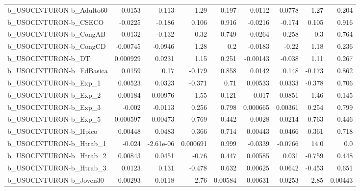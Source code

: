 \begin{tabular}{lrrrrrrrr}
b\_USOCINTURON-b\_Adulto60   &     -0.0153 &       -0.113 &      1.29 &    0.197 &    -0.0112 &     -0.0778 &         1.27 &         0.204 \\
b\_USOCINTURON-b\_CSECO      &     -0.0225 &       -0.186 &     0.106 &    0.916 &    -0.0216 &      -0.174 &        0.105 &         0.916 \\
b\_USOCINTURON-b\_CongAB     &     -0.0132 &       -0.132 &      0.32 &    0.749 &    -0.0264 &      -0.258 &          0.3 &         0.764 \\
b\_USOCINTURON-b\_CongCD     &    -0.00745 &      -0.0946 &      1.28 &      0.2 &    -0.0183 &       -0.22 &         1.18 &         0.236 \\
b\_USOCINTURON-b\_DT         &    0.000929 &       0.0231 &      1.15 &    0.251 &   -0.00143 &      -0.038 &         1.11 &         0.267 \\
b\_USOCINTURON-b\_EdBasica   &      0.0159 &         0.17 &    -0.179 &    0.858 &     0.0142 &       0.148 &       -0.173 &         0.862 \\
b\_USOCINTURON-b\_Exp\_1      &     0.00523 &       0.0323 &    -0.371 &     0.71 &    0.00533 &      0.0333 &       -0.378 &         0.706 \\
b\_USOCINTURON-b\_Exp\_2      &    -0.00184 &     -0.00976 &     -1.55 &    0.121 &     -0.017 &     -0.0851 &        -1.46 &         0.145 \\
b\_USOCINTURON-b\_Exp\_3      &      -0.002 &      -0.0113 &     0.256 &    0.798 &   0.000665 &     0.00361 &        0.254 &         0.799 \\
b\_USOCINTURON-b\_Exp\_5      &    0.000597 &      0.00473 &     0.769 &    0.442 &     0.0028 &      0.0214 &        0.763 &         0.446 \\
b\_USOCINTURON-b\_Hpico      &     0.00448 &       0.0483 &     0.366 &    0.714 &    0.00443 &      0.0466 &        0.361 &         0.718 \\
b\_USOCINTURON-b\_Htrab\_1    &      -0.024 &    -2.61e-06 &  0.000691 &    0.999 &    -0.0339 &     -0.0766 &         14.0 &           0.0 \\
b\_USOCINTURON-b\_Htrab\_2    &     0.00843 &       0.0451 &     -0.76 &    0.447 &    0.00585 &       0.031 &       -0.759 &         0.448 \\
b\_USOCINTURON-b\_Htrab\_3    &      0.0123 &        0.131 &    -0.478 &    0.632 &    0.00625 &      0.0642 &       -0.453 &         0.651 \\
b\_USOCINTURON-b\_Joven30    &    -0.00293 &      -0.0118 &      2.76 &  0.00584 &    0.00631 &      0.0253 &         2.85 &       0.00443 \\

\end{tabular}
